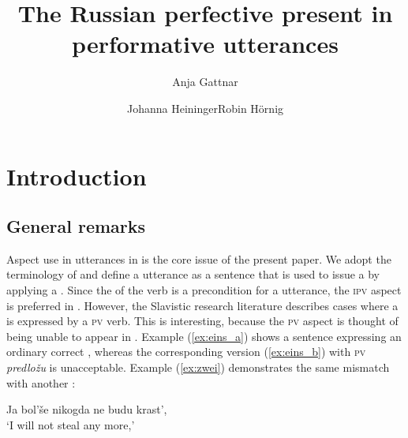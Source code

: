 \documentclass[output=paper,colorlinks,citecolor=brown,newtxmath,hidelinks]{langscibook}
\title{The Russian perfective present in performative utterances}
\author{Anja Gattnar\affiliation{University of Tübingen}\and  Johanna Heininger\affiliation{University of Tübingen}\lastand  Robin Hörnig\affiliation{University of Tübingen}}
\begin{document}
\maketitle
{}
%

\section{Introduction}

\subsection{General remarks}
Aspect use in  utterances in  is the core issue of the present paper. We adopt the terminology of \citet{Eckardt2012} and define a  utterance as a sentence that is used to issue a  by applying a . Since the  of the verb is a precondition for a  utterance, the \textsc{ipv}  aspect is preferred in . However, the Slavistic research literature describes cases where a  is expressed by a \textsc{pv} verb. This is interesting, because the \textsc{pv} aspect is thought of being unable to appear in . Example (\ref{ex:eins_a}) shows a sentence expressing an ordinary correct , whereas the corresponding version (\ref{ex:eins_b}) with \textsc{pv} \textit{predložu} is unacceptable. Example (\ref{ex:zwei}) demonstrates the same mismatch with another :

\ea\label{ex:eins}
           \z
\z

\ea\label{ex:zwei} Ja bol’še nikogda ne budu krast',\\‘I will not steal any more,’
           \z
\z
\end{document}
